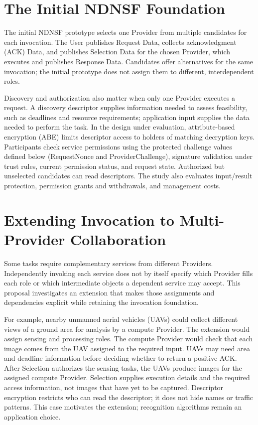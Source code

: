 \section{The Initial NDNSF Foundation}
The initial NDNSF prototype selects one Provider from multiple candidates for each invocation. The User publishes Request Data, collects acknowledgment (ACK) Data, and publishes Selection Data for the chosen Provider, which executes and publishes Response Data. Candidates offer alternatives for the same invocation; the initial prototype does not assign them to different, interdependent roles.

Discovery and authorization also matter when only one Provider executes a request. A discovery descriptor supplies information needed to assess feasibility, such as deadlines and resource requirements; application input supplies the data needed to perform the task. In the design under evaluation, attribute-based encryption (ABE) limits descriptor access to holders of matching decryption keys. Participants check service permissions using the protected challenge values defined below (RequestNonce and ProviderChallenge), signature validation under trust rules, current permission status, and request state. Authorized but unselected candidates can read descriptors. The study also evaluates input/result protection, permission grants and withdrawals, and management costs.



\section{Extending Invocation to Multi-Provider Collaboration}
Some tasks require complementary services from different Providers. Independently invoking each service does not by itself specify which Provider fills each role or which intermediate objects a dependent service may accept. This proposal investigates an extension that makes those assignments and dependencies explicit while retaining the invocation foundation.

For example, nearby unmanned aerial vehicles (UAVs) could collect different views of a ground area for analysis by a compute Provider. The extension would assign sensing and processing roles. The compute Provider would check that each image comes from the UAV assigned to the required input. UAVs may need area and deadline information before deciding whether to return a positive ACK. After Selection authorizes the sensing tasks, the UAVs produce images for the assigned compute Provider. Selection supplies execution details and the required access information, not images that have yet to be captured. Descriptor encryption restricts who can read the descriptor; it does not hide names or traffic patterns. This case motivates the extension; recognition algorithms remain an application choice.

